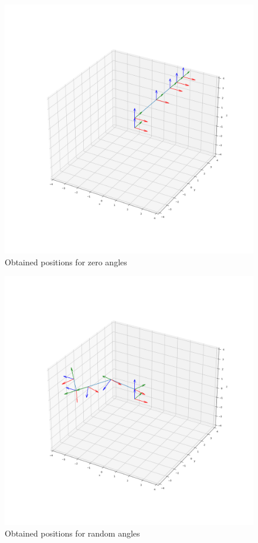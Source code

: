 \documentclass{article}
\begin{document}
    \begin{figure}[h]
        \centering
        \includegraphics[width=\linewidth]{forward_zeros}
        \caption{Obtained positions for zero angles}
        \label{fig:figure1}
    \end{figure}
    
    \begin{figure}[h]
        \centering
        \includegraphics[width=\linewidth]{forward_random}
        \caption{Obtained positions for random angles}
        \label{fig:figure2}
    \end{figure}
    
\end{document}
